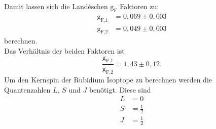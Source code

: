 Damit lassen sich die Landéschen $\text{g}_{\text{F}}$ Faktoren zu:
\begin{align*}
  \text{g}_{\text{F,1}}&=0,069 \pm 0,003 \\
  \text{g}_{\text{F,2}}&= 0,049 \pm 0,003
\end{align*}
berechnen.\\
Das Verhältnis der beiden Faktoren ist
\begin{equation}
  \frac{\text{g}_{\text{F,1}}}{  \text{g}_{\text{F,2}}}= 1,43 \pm 0,12.
\end{equation}
Um den Kernspin der Rubidium Isoptope zu berechnen werden die Quantenzahlen $L$,
$S$ und $J$ benötigt.
Diese sind
\begin{align*}
  L&=0\\
  S&=\frac{1}{2}\\
  J&=\frac{1}{2}
\end{align*}



